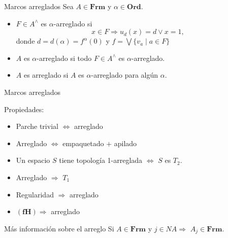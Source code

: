 \documentclass[compress,12pt]{beamer}
\begin{document}
\begin{frame}{Marcos arreglados}
    Sea $A\in \mathbf{Frm}$ y $\alpha\in \mathbf{Ord}$. 
    \begin{itemize}
        \item $F\in A^\wedge$ es $\alpha$-arreglado si 
    \[
    x\in F\Rightarrow u_d(x)=d\vee x=1,
    \]
    donde $d=d(\alpha)=f^\alpha(0)$ y $f=\bigvee\{v_a\mid a\in F\}$
    \item $A$ es $\alpha$-arreglado si todo $F\in A^\wedge$ es $\alpha$-arreglado.
    \item $A$ es arreglado si $A$ es $\alpha$-arreglado para algún $\alpha$.
    \end{itemize}
\end{frame}

\begin{frame}{Marcos arreglados}
    \begin{block}{Propiedades:}
        \begin{itemize}
            \item Parche trivial $\Leftrightarrow$ arreglado
            \item Arreglado $\Leftrightarrow $ empaquetado $+$ apilado
            \item Un espacio $S$ tiene topología 1-arreglada $\Leftrightarrow$ $S$ es $T_2$.
            \item Arreglado $\Rightarrow$ $T_1$
            \item Regularidad $\Rightarrow$ arreglado
            \item $(\mathbf{fH})\Rightarrow$ arreglado
        \end{itemize}
    \end{block}
\end{frame}

\begin{frame}{Más información sobre el arreglo}
  Si $A\in \mathbf{Frm}$ y $j\in NA\Rightarrow$ $A_j\in \mathbf{Frm}$.
\end{frame}
\end{document}
